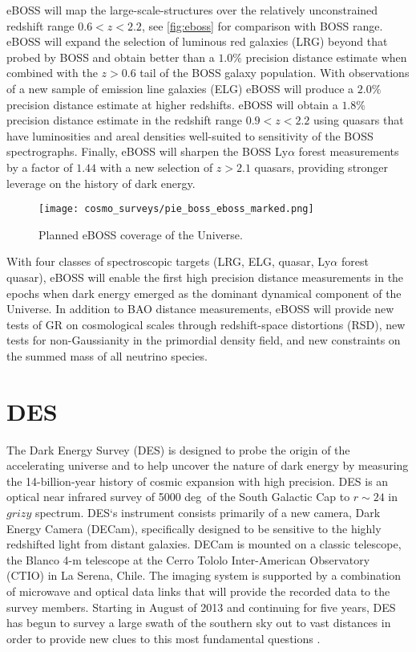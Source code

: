 eBOSS will map the large-scale-structures over the relatively unconstrained redshift range $0.6<z< 2.2$, see \autoref{fig:eboss} for comparison with BOSS range. eBOSS will expand the selection of luminous red galaxies (LRG) beyond that probed by BOSS and obtain better than a $1.0\%$ precision distance estimate when combined with the $z > 0.6$ tail of the BOSS galaxy population. With observations of a new sample of emission line galaxies (ELG) eBOSS will produce a $2.0\%$ precision distance estimate at higher redshifts. eBOSS will obtain a $1.8\%$ precision distance estimate in the redshift range $0.9 < z < 2.2$ using quasars that have luminosities and areal densities well-suited to sensitivity of the BOSS spectrographs. Finally, eBOSS will sharpen the BOSS Ly$\alpha$ forest measurements by a factor of $1.44$ with a new selection of $z > 2.1$ quasars, providing stronger leverage on the history of dark energy.
\begin{figure}[ht]
    \centering
    \texttt{[image: cosmo\_surveys/pie\_boss\_eboss\_marked.png]}
    \caption{Planned eBOSS coverage of the Universe.}
    \label{fig:eboss}
\end{figure}

With four classes of spectroscopic targets (LRG, ELG, quasar, Ly$\alpha$ forest quasar), eBOSS will enable the first high precision distance measurements in the epochs when dark energy emerged as the dominant dynamical component of the Universe. In addition to BAO distance measurements, eBOSS will provide new tests of GR on cosmological scales through redshift-space distortions (RSD), new tests for non-Gaussianity in the primordial density field, and new constraints on the summed mass of all neutrino species.


\section{DES}
\label{DES}
The Dark Energy Survey (DES) is designed to probe the origin of the accelerating universe and to help uncover the nature of dark energy by measuring the \mbox{14-billion-year} history of cosmic expansion with high precision. DES is an optical near infrared survey of 5000 deg\sq\ of the South Galactic Cap to $r\sim24$ in $grizy$ spectrum. DES`s instrument consists primarily of a new camera, Dark Energy Camera (DECam), specifically designed to be sensitive to the highly redshifted light from distant galaxies. DECam is mounted on a classic telescope, the Blanco 4-m telescope at the Cerro Tololo Inter-American Observatory (CTIO) in La Serena, Chile. The imaging system is supported by a combination of microwave and optical data links that will provide the recorded data to the survey members. Starting in August of 2013 and continuing for five years, DES has begun to survey a large swath of the southern sky out to vast distances in order to provide new clues to this most fundamental questions \cite{DES}.

